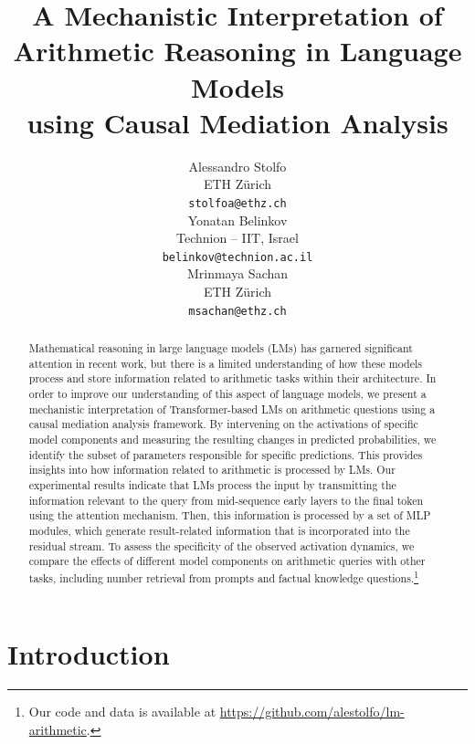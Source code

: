 \documentclass[11pt]{article}
\title{
A Mechanistic Interpretation of Arithmetic Reasoning in Language Models\\using Causal Mediation Analysis
}
\author{Alessandro Stolfo \\
  ETH Z\"urich \\
  \texttt{stolfoa@ethz.ch} \\\And
  Yonatan Belinkov \\
  Technion -- IIT, Israel \\
  \texttt{belinkov@technion.ac.il} \\\And
  Mrinmaya Sachan \\
  ETH Z\"urich \\
  \texttt{msachan@ethz.ch} \\
  }
\begin{document}
\maketitle
\begin{abstract}
Mathematical reasoning in large language models (LMs) has garnered significant attention in recent work, but there is a limited understanding of how these models process and store information related to arithmetic tasks within their architecture.
In order to improve our understanding of this aspect of language models, we present a mechanistic interpretation of Transformer-based LMs on arithmetic questions using a causal mediation analysis framework.
By intervening on the activations of specific model components and measuring the resulting changes in predicted probabilities, we identify the subset of parameters responsible for specific predictions.
This provides insights into how information related to arithmetic is processed by LMs.
Our experimental results indicate that LMs process the input by transmitting the information relevant to the query from mid-sequence early layers to the final token using the attention mechanism. Then, this information is processed by a set of MLP modules, which generate result-related information that is incorporated into the residual stream.
To assess the specificity of the observed activation dynamics, we compare the effects of different model components on arithmetic queries with other tasks, including number retrieval from prompts and factual knowledge questions.\footnote{Our code and data is available at \url{https://github.com/alestolfo/lm-arithmetic}.}




\end{abstract}

\section{Introduction}
\end{document}

